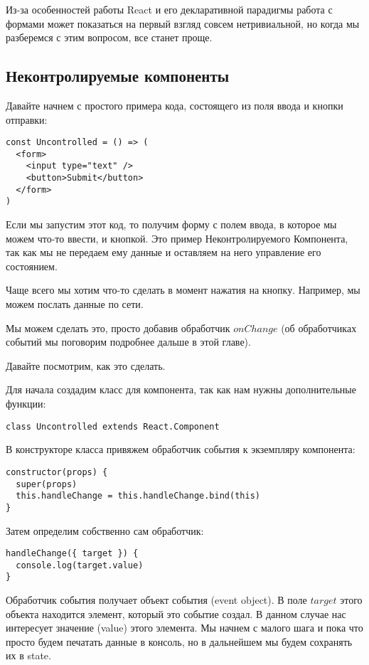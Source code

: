 Из-за особенностей работы React и его декларативной парадигмы работа с формами может показаться на первый взгляд совсем нетривиальной, но когда мы разберемся с этим вопросом, все станет проще.

\subsection{Неконтролируемые компоненты}

Давайте начнем с простого примера кода, состоящего из поля ввода и кнопки отправки:

\begin{lstlisting}
const Uncontrolled = () => (
  <form>
    <input type="text" />
    <button>Submit</button>
  </form>
)
\end{lstlisting}

Если мы запустим этот код, то получим форму с полем ввода, в которое мы можем что-то ввести, и кнопкой. Это пример Неконтролируемого Компонента, так как мы не передаем ему данные и оставляем на него управление его состоянием.

Чаще всего мы хотим что-то сделать в момент нажатия на кнопку. Например, мы можем послать данные по сети.

Мы можем сделать это, просто добавив обработчик $onChange$ (об обработчиках событий мы поговорим подробнее дальше в этой главе).

Давайте посмотрим, как это сделать.

Для начала создадим класс для компонента, так как нам нужны дополнительные функции:
\begin{lstlisting}
class Uncontrolled extends React.Component	
\end{lstlisting}

В конструкторе класса привяжем обработчик события к экземпляру компонента:

\begin{lstlisting}
constructor(props) {
  super(props)
  this.handleChange = this.handleChange.bind(this)
}
\end{lstlisting}

Затем определим собственно сам обработчик:

\begin{lstlisting}
handleChange({ target }) {
  console.log(target.value)
}
\end{lstlisting}

Обработчик события получает объект события (event object). В поле $target$ этого объекта находится элемент, который это событие создал. В данном случае нас интересует значение (value) этого элемента. Мы начнем с малого шага и пока что просто будем печатать данные в консоль, но в дальнейшем мы будем сохранять их в state.

